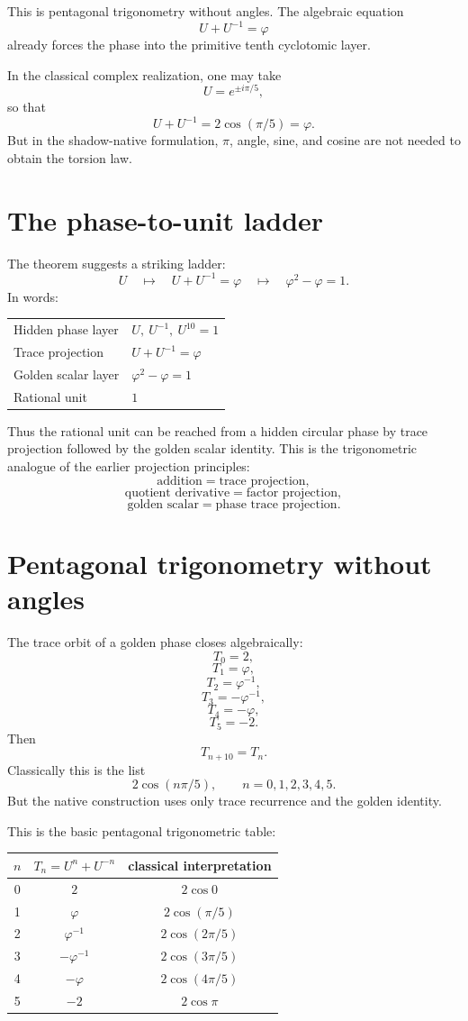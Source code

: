 \documentclass[11pt]{article}
\newcommand{\ph}{\varphi}
\begin{document}
This is pentagonal trigonometry without angles.  The algebraic equation
\[
    U+U^{-1}=\ph
\]
already forces the phase into the primitive tenth cyclotomic layer.

In the classical complex realization, one may take
\[
    U=e^{\pm i\pi/5},
\]
so that
\[
    U+U^{-1}=2\cos(\pi/5)=\ph.
\]
But in the shadow-native formulation, $\pi$, angle, sine, and cosine are not needed to obtain the torsion law.

\section{The phase-to-unit ladder}

The theorem suggests a striking ladder:
\[
    U
    \quad\longmapsto\quad
    U+U^{-1}=\ph
    \quad\longmapsto\quad
    \ph^2-\ph=1.
\]
In words:
\begin{center}
\begin{tabular}{ll}
\toprule
Hidden phase layer & $U,\ U^{-1},\ U^{10}=1$ \\
Trace projection & $U+U^{-1}=\ph$ \\
Golden scalar layer & $\ph^2-\ph=1$ \\
Rational unit & $1$ \\
\bottomrule
\end{tabular}
\end{center}

Thus the rational unit can be reached from a hidden circular phase by trace projection followed by the golden scalar identity.  This is the trigonometric analogue of the earlier projection principles:
\[
    \text{addition} = \text{trace projection},
\]
\[
    \text{quotient derivative} = \text{factor projection},
\]
\[
    \text{golden scalar} = \text{phase trace projection}.
\]

\section{Pentagonal trigonometry without angles}

The trace orbit of a golden phase closes algebraically:
\[
    T_0=2,
\]
\[
    T_1=\ph,
\]
\[
    T_2=\ph^{-1},
\]
\[
    T_3=-\ph^{-1},
\]
\[
    T_4=-\ph,
\]
\[
    T_5=-2.
\]
Then
\[
    T_{n+10}=T_n.
\]
Classically this is the list
\[
    2\cos(n\pi/5),\qquad n=0,1,2,3,4,5.
\]
But the native construction uses only trace recurrence and the golden identity.

This is the basic pentagonal trigonometric table:
\begin{center}
\begin{tabular}{c c c}
\toprule
$n$ & $T_n=U^n+U^{-n}$ & classical interpretation \\
\midrule
0 & $2$ & $2\cos 0$ \\
1 & $\ph$ & $2\cos(\pi/5)$ \\
2 & $\ph^{-1}$ & $2\cos(2\pi/5)$ \\
3 & $-\ph^{-1}$ & $2\cos(3\pi/5)$ \\
4 & $-\ph$ & $2\cos(4\pi/5)$ \\
5 & $-2$ & $2\cos \pi$ \\
\bottomrule
\end{tabular}
\end{center}
\end{document}
